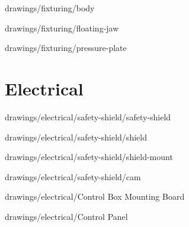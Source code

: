 
            {drawings/fixturing/body}


            {drawings/fixturing/floating-jaw}


            {drawings/fixturing/pressure-plate}


\section{Electrical}


            {drawings/electrical/safety-shield/safety-shield}


            {drawings/electrical/safety-shield/shield}


            {drawings/electrical/safety-shield/shield-mount}


            {drawings/electrical/safety-shield/cam}


            {drawings/electrical/Control Box Mounting Board}


            {drawings/electrical/Control Panel}